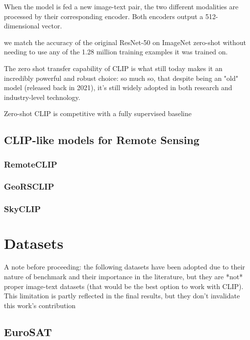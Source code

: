 \documentclass[a4paper, oneside, english]{sapthesis}
\begin{document}
When the model is fed a new image-text pair, the two different modalities are processed by their corresponding encoder. Both encoders output a 512-dimensional vector.

we match the accuracy of the original ResNet-50 on ImageNet zero-shot without needing to use any of the 1.28 million training examples it was trained on.

The zero shot transfer capability of CLIP is what still today makes it an incredibly powerful and robust choice: so much so, that despite being an "old" model (released back in 2021), it's still widely adopted in both research and industry-level technology. 

Zero-shot CLIP is competitive with a fully supervised baseline


\section{CLIP-like models for Remote Sensing}

\subsection{RemoteCLIP}

\subsection{GeoRSCLIP}

\subsection{SkyCLIP}



\chapter{Datasets} %

A note before proceeding: the following datasets have been adopted due to their nature of benchmark and their importance in the literature, but they are *not* proper image-text datasets (that would be the best option to work with CLIP). This limitation is partly reflected in the final results, but they don't invalidate this work's contribution 

\section{EuroSAT}
\end{document}
